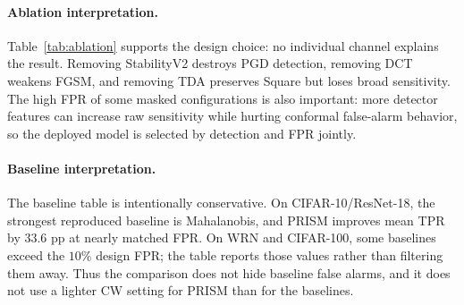 \documentclass{article}
\newcommand{\prism}{\textsc{PRISM}\xspace}
\begin{document}
\paragraph{Ablation interpretation.}
Table~\ref{tab:ablation} supports the design choice: no individual channel explains the result. Removing StabilityV2 destroys PGD detection, removing DCT weakens FGSM, and removing TDA preserves Square but loses broad sensitivity. The high FPR of some masked configurations is also important: more detector features can increase raw sensitivity while hurting conformal false-alarm behavior, so the deployed model is selected by detection and FPR jointly.

\paragraph{Baseline interpretation.}
The baseline table is intentionally conservative. On CIFAR-10/ResNet-18, the strongest reproduced baseline is Mahalanobis, and \prism improves mean TPR by $33.6$ pp at nearly matched FPR. On WRN and CIFAR-100, some baselines exceed the $10\%$ design FPR; the table reports those values rather than filtering them away. Thus the comparison does not hide baseline false alarms, and it does not use a lighter CW setting for \prism than for the baselines.
\end{document}
